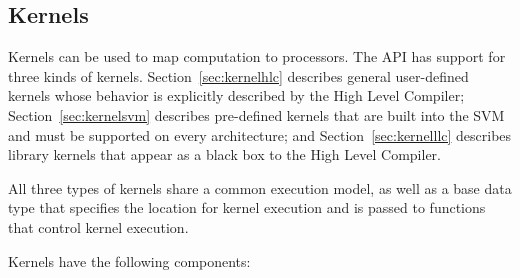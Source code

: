 \callc

\makeline
{}





\callkc
\makeline
{}





\callkc
\makeline

\subsection{Kernels}
\label{sec:kernel}

Kernels can be used to map computation to processors.  The API has
support for three kinds of kernels. Section~\ref{sec:kernelhlc}
describes general user-defined kernels whose behavior is explicitly
described by the High Level Compiler; Section~\ref{sec:kernelsvm}
describes pre-defined kernels that are built into the SVM and must be
supported on every architecture; and Section~\ref{sec:kernelllc}
describes library kernels that appear as a black box to the High Level 
Compiler.

All three types of kernels share a common execution model, as well as
a base data type that specifies the location for kernel execution and
is passed to functions that control kernel execution.

Kernels have the following components:


